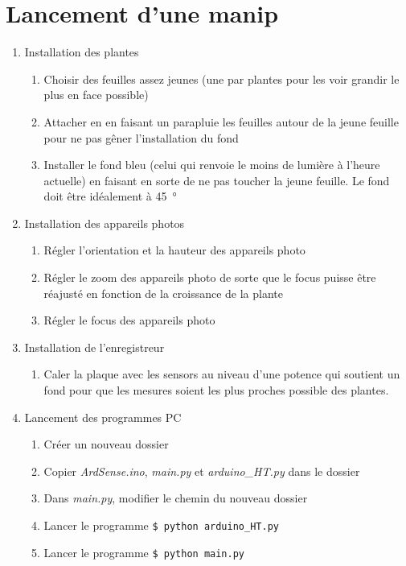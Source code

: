 \documentclass[10pt,a4paper]{article}
\begin{document}
\section{Lancement d'une manip}
\begin{enumerate}
\item Installation des plantes
	\begin{enumerate}
	\item Choisir des feuilles assez jeunes (une par plantes pour les voir grandir le plus en face possible)
	\item Attacher en en faisant un parapluie les feuilles autour de la jeune feuille pour ne pas gêner l'installation du fond
	\item Installer le fond bleu (celui qui renvoie le moins de lumière à l'heure actuelle) en faisant en sorte de ne pas toucher la jeune feuille. Le fond doit être idéalement à \SI{45}{\degree}
	\end{enumerate}
\item Installation des appareils photos
	\begin{enumerate}
	\item Régler l'orientation et la hauteur des appareils photo
	\item Régler le zoom des appareils photo de sorte que le focus puisse être réajusté en fonction de la croissance de la plante
	\item Régler le focus des appareils photo
	\end{enumerate}
\item Installation de l'enregistreur
	\begin{enumerate}
	\item Caler la plaque avec les sensors au niveau d'une potence qui soutient un fond pour que les mesures soient les plus proches possible des plantes.
	\end{enumerate}
\item Lancement des programmes PC
	\begin{enumerate}
	\item Créer un nouveau dossier
	\item Copier \textit{ArdSense.ino}, \textit{main.py} et \textit{arduino\_HT.py} dans le dossier
	\item Dans \textit{main.py}, modifier le chemin du nouveau dossier
	\item Lancer le programme \texttt{\$ python arduino\_HT.py}
	\item Lancer le programme \texttt{\$ python main.py}
	\end{enumerate}
\end{enumerate}
\end{document}
